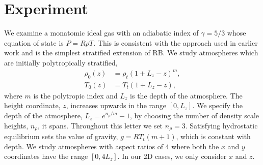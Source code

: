 \documentclass[aps, prl, twocolumn, nofootinbib, groupedaddress, amsfonts, amssymb, amsmath]{revtex4-1}
\begin{document}
\section{Experiment} 
\label{sec:experiment}
We examine a monatomic ideal gas with an adiabatic index of
$\gamma = 5/3$ whose equation of state is $P = R\rho T$.
This is consistent with the approach used in earlier work
and is the simplest stratified extension of RB.
We study atmospheres which are initially polytropically stratified,
\begin{equation}
\begin{split}
\rho_0(z) &= \rho_{t}(1 + L_z - z)^m, \\
T_0(z)    &= T_{t}(1 + L_z - z),
\label{eqn:polytrope}
\end{split}
\end{equation}
where $m$ is the polytropic index and $L_z$ is the depth of the atmosphere.
The height coordinate, $z$, increases upwards in the range $[0, L_z]$.  We
specify the depth of the atmosphere, $L_z = e^{n_{\rho}/m} - 1$, by choosing
the number of density scale heights, $n_{\rho}$, it spans.
Throughout this letter we set $n_{\rho} = 3$.  Satisfying hydrostatic
equilibrium sets the value of gravity, $g = R T_t (m + 1)$, which is
constant with depth.  We study atmospheres with aspect
ratios of 4 where both the $x$ and $y$ coordinates have the range $[0, 4L_z]$.
In our 2D cases, we only consider $x$ and $z$.
\end{document}

